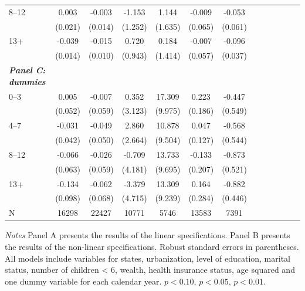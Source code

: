 \documentclass[12pt,english]{article}
\begin{document}
\begin{table}[!ht]
\begin{center}
\begin{adjustbox}{max width=.9\linewidth}
\begin{threeparttable}
{\begin{tabular}{l*{6}{S S}}
						8--12 &    0.003         &   -0.003         &   -1.153         &    1.144         &   -0.009         &   -0.053         \\
						&  (0.021)         &  (0.014)         &  (1.252)         &  (1.635)         &  (0.065)         &  (0.061)         \\
						13+ &    -0.039\sym{***}&   -0.015         &    0.720         &    0.184         &   -0.007         &   -0.096\sym{***}\\
						&  (0.014)         &  (0.010)         &  (0.943)         &  (1.414)         &  (0.057)         &  (0.037)         \\
						\textit{\textbf{Panel C: dummies}} &&&&&&\\
						0--3&    0.005         &   -0.007         &    0.352         &   17.309\sym{*}  &    0.223         &   -0.447         \\
						&  (0.052)         &  (0.059)         &  (3.123)         &  (9.975)         &  (0.186)         &  (0.549)         \\
						4--7&    -0.031         &   -0.049         &    2.860         &   10.878         &    0.047         &   -0.568         \\
						&  (0.042)         &  (0.050)         &  (2.664)         &  (9.504)         &  (0.127)         &  (0.544)         \\
						8--12&    -0.066         &   -0.026         &   -0.709         &   13.733         &   -0.133         &   -0.873\sym{*}  \\
						&  (0.063)         &  (0.059)         &  (4.181)         &  (9.695)         &  (0.207)         &  (0.521)         \\
						13+&   -0.134         &   -0.062         &   -3.379         &   13.309         &    0.164         &   -0.882\sym{**} \\
						&  (0.098)         &  (0.068)         &  (4.715)         &  (9.239)         &  (0.284)         &  (0.446)         \\
						\midrule
						N         &    16298         &    22427         &    10771         &     5746         &    13583         &     7391         \\
						\bottomrule
					\end{tabular}
					\begin{tablenotes}
						\item \footnotesize \textit{Notes} Panel A presents the results of the linear specifications. Panel B presents the results of the non-linear specifications. Robust standard errors in parentheses. All models include variables for  states, urbanization, level of education, marital status, number of children < 6, wealth, health insurance status, age squared and one dummy variable for each calendar year. \sym{*} \(p<0.10\), \sym{**} \(p<0.05\), \sym{***} \(p<0.01\).
					\end{tablenotes}
				}
			\end{threeparttable}
		\end{adjustbox}
	\end{center}
\end{table}
\end{document}
